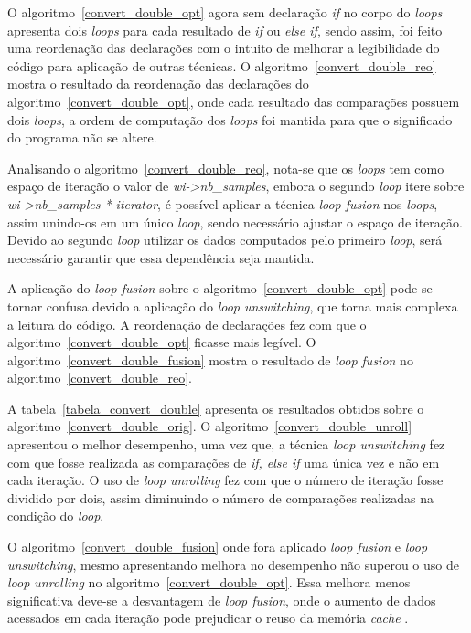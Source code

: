 O algoritmo~\ref{convert_double_opt} agora sem declaração \textit{if} no corpo
do \textit{loops} apresenta dois \textit{loops} para cada resultado de
\textit{if} ou \textit{else if}, sendo assim, foi feito uma reordenação das
declarações com o intuito de melhorar a legibilidade do código para aplicação de
outras técnicas.
O algoritmo~\ref{convert_double_reo} mostra o resultado da reordenação das
declarações do algoritmo~\ref{convert_double_opt}, onde cada resultado das
comparações possuem dois \textit{loops}, a ordem de computação dos
\textit{loops} foi mantida para que o significado do programa não se altere.

Analisando o algoritmo~\ref{convert_double_reo}, nota-se que os 
\textit{loops} tem como
espaço de iteração o valor de \textit{wi->nb\_samples}, embora o segundo
\textit{loop} itere sobre \textit{wi->nb\_samples * iterator},  é possível aplicar
a técnica \textit{loop fusion} nos \textit{loops}, assim unindo-os em um
único \textit{loop}, sendo necessário ajustar o espaço de iteração. 
Devido ao
segundo \textit{loop} utilizar os dados computados pelo primeiro \textit{loop},
será necessário garantir que essa dependência seja mantida.

A aplicação do \textit{loop fusion} sobre o
algoritmo~\ref{convert_double_opt} pode se tornar confusa devido a aplicação do
\textit{loop unswitching}, que torna mais complexa a leitura do código. 
A reordenação de declarações fez com que o algoritmo~\ref{convert_double_opt}
ficasse mais legível.
O algoritmo~\ref{convert_double_fusion} mostra o 
resultado de \textit{loop fusion} no algoritmo~\ref{convert_double_reo}. 


A tabela~\ref{tabela_convert_double} apresenta os resultados obtidos sobre o
algoritmo~\ref{convert_double_orig}.
O algoritmo~\ref{convert_double_unroll} apresentou o melhor desempenho, uma vez
que, a técnica \textit{loop unswitching} fez com que fosse realizada as
comparações de \textit{if, else if} uma única vez e não em cada iteração.
O uso de \textit{loop unrolling} fez com que o número de iteração fosse dividido
por dois, assim diminuindo o número de comparações realizadas na condição do
\textit{loop}. 

O algoritmo~\ref{convert_double_fusion} onde fora aplicado \textit{loop fusion}
e \textit{loop unswitching}, mesmo apresentando melhora no desempenho não superou
o uso de \textit{loop unrolling} no algoritmo~\ref{convert_double_opt}.
Essa melhora menos significativa deve-se a desvantagem de \textit{loop
fusion}, onde o aumento de dados acessados em cada iteração pode prejudicar o
reuso da memória \textit{cache} \cite{Rivera:1999}.


